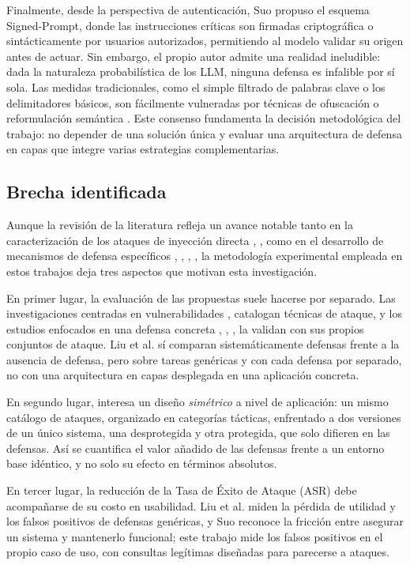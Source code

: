 \documentclass[twocolumn]{article}
\begin{document}
Finalmente, desde la perspectiva de autenticación, Suo \cite{ref9} propuso el esquema Signed-Prompt, donde las instrucciones críticas son firmadas criptográfica o sintácticamente por usuarios autorizados, permitiendo al modelo validar su origen antes de actuar. Sin embargo, el propio autor admite una realidad ineludible: dada la naturaleza probabilística de los LLM, ninguna defensa es infalible por sí sola. Las medidas tradicionales, como el simple filtrado de palabras clave o los delimitadores básicos, son fácilmente vulneradas por técnicas de ofuscación o reformulación semántica \cite{ref9}. Este consenso fundamenta la decisión metodológica del trabajo: no depender de una solución única y evaluar una arquitectura de defensa en capas que integre varias estrategias complementarias.


\subsection{Brecha identificada}

Aunque la revisión de la literatura refleja un avance notable tanto en la caracterización de los ataques de inyección directa \cite{ref1}, \cite{ref2}, \cite{ref10} como en el desarrollo de mecanismos de defensa específicos \cite{ref6}, \cite{ref7}, \cite{ref8}, \cite{ref9}, la metodología experimental empleada en estos trabajos deja tres aspectos que motivan esta investigación.

En primer lugar, la evaluación de las propuestas suele hacerse por separado. Las investigaciones centradas en vulnerabilidades \cite{ref1}, \cite{ref10} catalogan técnicas de ataque, y los estudios enfocados en una defensa concreta \cite{ref6}, \cite{ref7}, \cite{ref8}, \cite{ref9} la validan con sus propios conjuntos de ataque. Liu et al. \cite{ref5} sí comparan sistemáticamente defensas frente a la ausencia de defensa, pero sobre tareas genéricas y con cada defensa por separado, no con una arquitectura en capas desplegada en una aplicación concreta.

En segundo lugar, interesa un diseño \textit{simétrico} a nivel de aplicación: un mismo catálogo de ataques, organizado en categorías tácticas, enfrentado a dos versiones de un único sistema, una desprotegida y otra protegida, que solo difieren en las defensas. Así se cuantifica el valor añadido de las defensas frente a un entorno base idéntico, y no solo su efecto en términos absolutos.

En tercer lugar, la reducción de la Tasa de Éxito de Ataque (ASR) debe acompañarse de su costo en usabilidad. Liu et al. \cite{ref5} miden la pérdida de utilidad y los falsos positivos de defensas genéricas, y Suo \cite{ref9} reconoce la fricción entre asegurar un sistema y mantenerlo funcional; este trabajo mide los falsos positivos en el propio caso de uso, con consultas legítimas diseñadas para parecerse a ataques.
\end{document}
